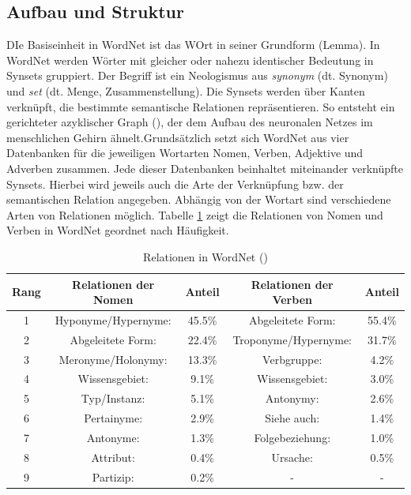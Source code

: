 \subsection{Aufbau und Struktur}

DIe Basiseinheit in WordNet ist das WOrt in seiner Grundform (Lemma). In WordNet werden Wörter mit gleicher oder nahezu identischer Bedeutung in Synsets gruppiert. Der Begriff ist ein Neologismus aus \textit{synonym} (dt. Synonym) und \textit{set} (dt. Menge, Zusammenstellung). Die Synsets werden über Kanten verknüpft, die bestimmte semantische Relationen repräsentieren. So entsteht ein gerichteter azyklischer Graph (\cite[vgl.][12]{OLTRAMANI}), der dem Aufbau des neuronalen Netzes im menschlichen Gehirn ähnelt.Grundsätzlich setzt sich WordNet aus vier Datenbanken für die jeweiligen Wortarten Nomen, Verben, Adjektive und Adverben zusammen. Jede dieser Datenbanken beinhaltet miteinander verknüpfte Synsets. Hierbei wird jeweils auch die Arte der Verknüpfung bzw. der semantischen Relation angegeben. Abhängig von der Wortart sind verschiedene Arten von Relationen möglich. Tabelle \ref{table:table2} zeigt die Relationen von Nomen und Verben in WordNet geordnet nach Häufigkeit.
\par
\begin{table}[h!]
  \centering
  \begin{tabular}{ccccc} %
    \toprule
     Rang & Relationen der Nomen & Anteil  & Relationen der Verben & Anteil \\
    \midrule
    1 & Hyponyme/Hypernyme: & 45.5\% & Abgeleitete Form:    & 55.4\% \\
    2 & Abgeleitete Form:   & 22.4\% & Troponyme/Hypernyme: & 31.7\% \\
    3 & Meronyme/Holonymy:  & 13.3\% & Verbgruppe:          & 4.2\%  \\
    4 & Wissensgebiet:      & 9.1\%  & Wissensgebiet:       & 3.0\%  \\
    5 & Typ/Instanz: 		& 5.1\%  & Antonymy:			& 2.6\%  \\
    6 & Pertainyme: 		& 2.9\%  & Siehe auch: 		    & 1.4\%  \\
    7 & Antonyme: 			& 1.3\% & Folgebeziehung: 	    & 1.0\%  \\
	8 & Attribut: 			& 0.4\%  & Ursache: 			& 0.5\%  \\
	9 & Partizip: 	        & 0.2\%  & -     	            & -  	 \\
	\bottomrule
  \end{tabular}
  \caption{Relationen in WordNet (\cite[vgl.][9]{MAZIARZ})}
  \label{table:table2}
\end{table}
\par

